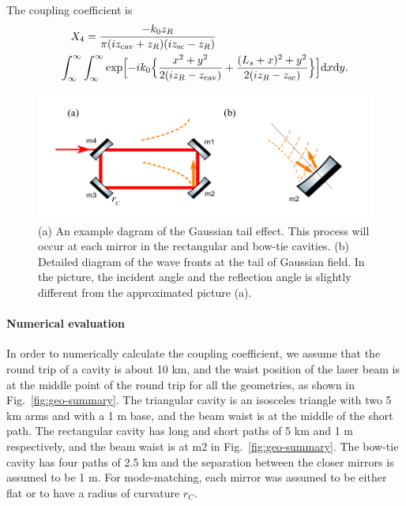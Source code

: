 The coupling coefficient is
\begin{eqnarray}
\begin{split}
X_4=\frac{-k_0 z_R}{\pi (i z _{\rm cav}+z_R) (iz _{\rm sc}-z_R)}\qquad \qquad \qquad \qquad \qquad \qquad \\
\int_{\infty}^{\infty} \int_{\infty}^{\infty}
\exp \Bigl[-i k_0 \Bigl\{
\frac{x^2+y^2}{2(i z_R-z _{\rm cav})}+\frac{(L_s+x)^2+y^2}{2(i z_R-z _{\rm sc})} \Bigr\}
\Bigl]  {\rm d}x {\rm d}y.
\end{split}
\end{eqnarray}


\begin{figure}
\centering
\includegraphics[scale =1]{./Sec_Optics/Gtail.pdf}
\caption{(a) An example dagram of the Gaussian tail effect. This process will occur at each mirror
in the rectangular and bow-tie cavities.
(b) Detailed diagram of the wave fronts at the tail of Gaussian field.
In the picture, the incident angle and the reflection angle
is slightly different from the approximated picture (a).}
\label{fig:Gtail}
\end{figure}


\paragraph{Numerical evaluation}

In order to numerically calculate the coupling coefficient,
we assume that the round trip of a cavity is about 10 km,
and the waist position of the laser beam is at the middle point of the round trip
for all the geometries, as shown in Fig.~\ref{fig:geo-summary}.
The triangular cavity is an isosceles triangle with two 5 km arms and with a 1 m base,
and the beam waist is at the middle of the short path.
The rectangular cavity has long and short paths of 5 km and 1 m respectively,
and the beam waist is at m2 in Fig.~\ref{fig:geo-summary}.
The bow-tie cavity has four paths of 2.5 km
and the separation between the closer mirrors is assumed to be 1 m.
For mode-matching, each mirror was assumed to be either flat
or to have a radius of curvature $r_C$.


